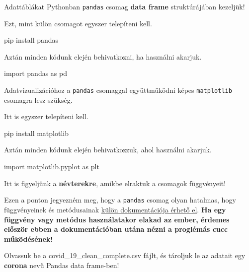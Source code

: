 \documentclass[
]{book}
\newenvironment{Shaded}{\begin{snugshade}}{\end{snugshade}}
\newcommand{\ImportTok}[1]{#1}
\newcommand{\NormalTok}[1]{#1}
\begin{document}
Adattáblákat Pythonban \texttt{pandas} csomag \textbf{data frame} struktúrájában kezeljük!

Ezt, mint külön csomagot egyszer telepíteni kell.

\begin{Shaded}
\begin{Highlighting}[]
\NormalTok{pip install pandas}
\end{Highlighting}
\end{Shaded}

Aztán minden kódunk elején behivatkozni, ha használni akarjuk.

\begin{Shaded}
\begin{Highlighting}[]
\ImportTok{import}\NormalTok{ pandas }\ImportTok{as}\NormalTok{ pd}
\end{Highlighting}
\end{Shaded}

Adatvizualizációhoz a \texttt{pandas} csomaggal együttműködni képes \texttt{matplotlib} csomagra lesz szükség.

Itt is egyszer telepíteni kell.

\begin{Shaded}
\begin{Highlighting}[]
\NormalTok{pip install matplotlib}
\end{Highlighting}
\end{Shaded}

Aztán minden kódunk elején behivatkozzuk, ahol használni akarjuk.

\begin{Shaded}
\begin{Highlighting}[]
\ImportTok{import}\NormalTok{ matplotlib.pyplot }\ImportTok{as}\NormalTok{ plt}
\end{Highlighting}
\end{Shaded}

Itt is figyeljünk a \textbf{névterekre}, amikbe elraktuk a csomagok függvényeit!

Ezen a ponton jegyezném meg, hogy a \texttt{pandas} csomag olyan hatalmas, hogy függvényeinek és metódusainak \href{https://pandas.pydata.org/docs/reference/index.html}{külön dokumentációja érhető el}. \textbf{Ha egy függvény vagy metódus használatakor elakad az ember, érdemes először ebben a dokumentációban utána nézni a proglémás cucc működésének!}

Olvassuk be a covid\_19\_clean\_complete.csv fájlt, és tároljuk le az adatait egy \textbf{corona} nevű Pandas data frame-ben!
\end{document}
